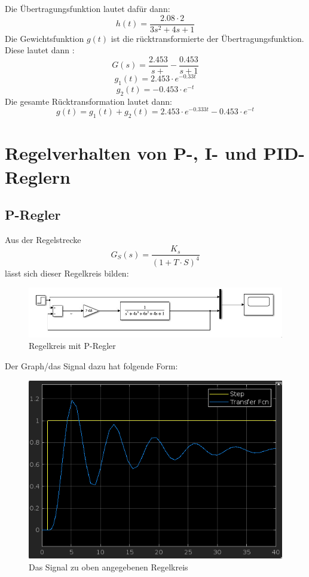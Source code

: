 \documentclass{article}
\begin{document}
\newpage
			Die Übertragungsfunktion lautet dafür dann:
			$$h(t) = \frac{2.08 \cdot 2}{3s^2 + 4s + 1}$$
			Die Gewichtsfunktion $g(t)$ ist die rücktransformierte der Übertragungsfunktion. \\
			Diese lautet dann :
			$$G(s) = \frac{2.453}{s+} - \frac{0.453}{s+1}$$
\vspace{2mm}	
			$$g_1(t) = 2.453 \cdot e^{-0.33t}$$
\vspace{0mm}
			$$g_2(t) = -0.453 \cdot e^{-t}$$
\vspace{1mm}
			Die gesamte Rücktransformation lautet dann:
			$$g(t) = g_1(t) + g_2(t) = 2.453 \cdot e^{-0.333t} - 0.453 \cdot e^{-t}$$
				
\newpage
	\section{Regelverhalten von P-, I- und PID-Reglern}
		\subsection{P-Regler}
			Aus der Regelstrecke 
			$$G_S(s) = \frac{K_s}{(1 + T\cdot S)^4}$$
			lässt sich dieser Regelkreis bilden:
			\begin{figure}[h]
				\includegraphics[scale=0.6, center]{4_a_Blockschaltbild.png}
				\caption{Regelkreis mit P-Regler}
				\label{fig33: Blockschaltbild_P_Regler}
			\end{figure}
			Der Graph/das Signal dazu hat folgende Form:
			\begin{figure}[h]
				\includegraphics[scale = 0.6, center]{4_a_Graph.png}
				\caption{Das Signal zu oben angegebenen Regelkreis}
				\label{fig34: 4_a_Graph}
			\end{figure}
\newpage
\end{document}
